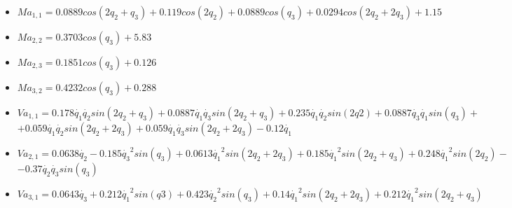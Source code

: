 \begin{itemize}
	\item $ Ma_{1,1}=0.0889cos(2q_{2} + q_{3}) + 0.119cos(2q_{2}) + 0.0889cos(q_{3}) + 0.0294cos(2q_{2} + 2q_{3}) + 1.15$ \\ \vspace{0.2cm}
	\item $ Ma_{2,2}=0.3703cos(q_{3}) + 5.83$ \\ \vspace{0.2cm}
	\item $ Ma_{2,3}=0.1851cos(q_{3}) + 0.126  $ \\ \vspace{0.2cm}
	\item $ Ma_{3,2}=0.4232cos(q_{3}) + 0.288  $ \\ \vspace{0.2cm}
	\item $ Va_{1,1}=0.178\dot{q_1}\dot{q_2}sin(2q_2 + q_3) + 0.0887\dot{q_1}\dot{q_3}sin(2q_2 + q_3) + 0.235\dot{q_1}\dot{q_2}sin(2q2) + 0.0887\dot{q_3}\dot{q_1}sin(q_3) + $ \\ \vspace{0.1cm}
	 $+0.059\dot{q_1}\dot{q_2}sin(2q_2 + 2q_3) + 0.059\dot{q_1}\dot{q_3}sin(2q_2 + 2q_3) - 0.12\dot{q_1} $ \\ \vspace{0.2cm}
	 \item $ Va_{2,1}=0.0638\dot{q_2} - 0.185\dot{q_3}^{2}sin(q_3) + 0.0613\dot{q_1}^{2}sin(2q_2 + 2q_3) + 0.185\dot{q_1}^{2}sin(2q_2 + q_3) + 0.248\dot{q_1}^{2}sin(2q_2) - $ \\ \vspace{0.1cm}
	 $ -0.37\dot{q_2}\dot{q_3}sin(q_3) $\\ \vspace{0.2cm}
	 \item $ Va_{3,1}= 0.0643\dot{q_3} + 0.212\dot{q_1}^{2}sin(q3) + 0.423\dot{q_2}^{2}sin(q_3) + 0.14\dot{q_1}^{2}sin(2q_2 + 2q_3) + 0.212\dot{q_1}^{2}sin(2q_2 + q_3) $
\end{itemize}

\newpage
